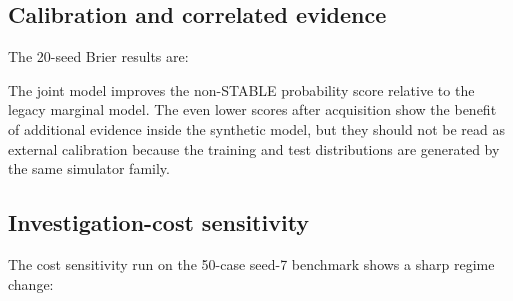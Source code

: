 \documentclass{article}
\begin{document}
\subsection{Calibration and correlated evidence}

The 20-seed Brier results are:

\begin{table}[t]
\centering
\scriptsize
{}
\caption{Brier error across 20 held-out seeds.}
\end{table}


The joint model improves the non-STABLE probability score relative to the legacy marginal model. The even lower scores after acquisition show the benefit of additional evidence inside the synthetic model, but they should not be read as external calibration because the training and test distributions are generated by the same simulator family.

\subsection{Investigation-cost sensitivity}

The cost sensitivity run on the 50-case seed-7 benchmark shows a sharp regime change:

\begin{table}[t]
\centering
\scriptsize
{}
\caption{Investigation-cost sensitivity on the 50-case seed-7 benchmark.}
\end{table}
\end{document}
